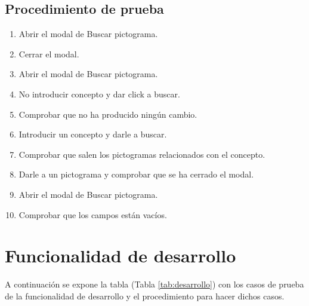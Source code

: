 \subsection{Procedimiento de prueba}
\label{procedimientoPruebas:busPicto}
\begin{enumerate}
    \item Abrir el modal de Buscar pictograma.
    \item Cerrar el modal.
    \item Abrir el modal de Buscar pictograma.
    \item No introducir concepto y dar click a buscar.
    \item Comprobar que no ha producido ningún cambio.
    \item Introducir un concepto y darle a buscar.
    \item Comprobar que salen los pictogramas relacionados con el concepto.
    \item Darle a un pictograma y comprobar que se ha cerrado el modal.
    \item Abrir el modal de Buscar pictograma.
    \item Comprobar que los campos están vacíos.

\end{enumerate}

\section{Funcionalidad de desarrollo}
\label{planPruebas:desarrollo}
A continuación se expone la tabla (Tabla \ref{tab:desarrollo}) con los casos de prueba de la funcionalidad de desarrollo y el procedimiento para hacer dichos casos.

